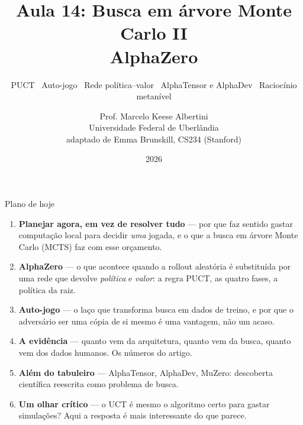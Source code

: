 \documentclass[aspectratio=169, 10pt]{beamer}
\title[Aula 14 — MCTS II: AlphaZero]{Aula 14: Busca em árvore Monte Carlo II\\ AlphaZero}
\subtitle[Aprendizagem por Reforço]{PUCT \textbullet\ Auto-jogo \textbullet\ Rede política--valor \textbullet\ AlphaTensor e AlphaDev \textbullet\ Raciocínio metanível}
\author[Prof. Marcelo K. Albertini]{Prof. Marcelo Keese Albertini \\
  \footnotesize Universidade Federal de Uberlândia \\
  \footnotesize adaptado de Emma Brunskill, CS234 (Stanford)}
\institute{Universidade Federal de Uberlândia}
\date{2026}
\begin{document}
\begin{frame}\titlepage\end{frame}

\begin{frame}{Plano de hoje}
  \begin{enumerate}\setlength{\itemsep}{0.35em}
    \item \textbf{Planejar agora, em vez de resolver tudo} — por que faz sentido
          gastar computação local para decidir \emph{uma} jogada, e o que a busca
          em árvore Monte Carlo (MCTS) faz com esse orçamento.
    \item \textbf{AlphaZero} — o que acontece quando a rollout aleatória é
          substituída por uma rede que devolve \emph{política} e \emph{valor}:
          a regra PUCT, as quatro fases, a política da raiz.
    \item \textbf{Auto-jogo} — o laço que transforma busca em dados de treino, e
          por que o adversário ser uma cópia de si mesmo é uma vantagem, não um
          acaso.
    \item \textbf{A evidência} — quanto vem da arquitetura, quanto vem da busca,
          quanto vem dos dados humanos. Os números do artigo.
    \item \textbf{Além do tabuleiro} — AlphaTensor, AlphaDev, MuZero: descoberta
          científica reescrita como problema de busca.
    \item \textbf{Um olhar crítico} — o UCT é mesmo o algoritmo certo para gastar
          simulações? Aqui a resposta é mais interessante do que parece.
  \end{enumerate}
\end{frame}
\end{document}
